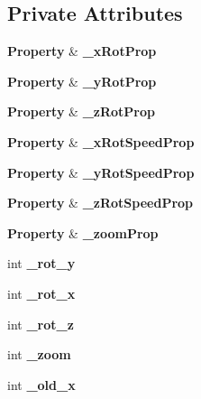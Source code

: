 \subsection*{Private Attributes}
\begin{DoxyCompactItemize}
\item 
{\bf Property} \& {\bfseries \-\_\-x\-Rot\-Prop}\label{classSoundfieldViewer_1_1CameraControl_a28a9241d5e5548bc0f26e22e1876ea19}

\item 
{\bf Property} \& {\bfseries \-\_\-y\-Rot\-Prop}\label{classSoundfieldViewer_1_1CameraControl_a66b78ba05b200c62f637ae3e977d4c05}

\item 
{\bf Property} \& {\bfseries \-\_\-z\-Rot\-Prop}\label{classSoundfieldViewer_1_1CameraControl_a447e23baf280c6c378e794196ffc31c5}

\item 
{\bf Property} \& {\bfseries \-\_\-x\-Rot\-Speed\-Prop}\label{classSoundfieldViewer_1_1CameraControl_a2c2beba1055569c5ef2357bbb7366787}

\item 
{\bf Property} \& {\bfseries \-\_\-y\-Rot\-Speed\-Prop}\label{classSoundfieldViewer_1_1CameraControl_acf558a8f07b6ced926b03a825ae3a95f}

\item 
{\bf Property} \& {\bfseries \-\_\-z\-Rot\-Speed\-Prop}\label{classSoundfieldViewer_1_1CameraControl_ab3f035579ecc09bcf61c9c66987eb6ef}

\item 
{\bf Property} \& {\bfseries \-\_\-zoom\-Prop}\label{classSoundfieldViewer_1_1CameraControl_a27919c886fef84c744b29df7dcdbc6ad}

\item 
int {\bfseries \-\_\-rot\-\_\-y}\label{classSoundfieldViewer_1_1CameraControl_ac69cc106febd8562e245abd4dcf4d48b}

\item 
int {\bfseries \-\_\-rot\-\_\-x}\label{classSoundfieldViewer_1_1CameraControl_ae9dc55d8abe16c4bcff0b474b7c8a004}

\item 
int {\bfseries \-\_\-rot\-\_\-z}\label{classSoundfieldViewer_1_1CameraControl_aee27419a23956fa4adf1a4564b509d05}

\item 
int {\bfseries \-\_\-zoom}\label{classSoundfieldViewer_1_1CameraControl_ac913949c0bf2bb0e57bfb34ccda23cc6}

\item 
int {\bfseries \-\_\-old\-\_\-x}\label{classSoundfieldViewer_1_1CameraControl_a58d80b2bc429942c3139876cc6e5e48d}


\end{DoxyCompactItemize}
